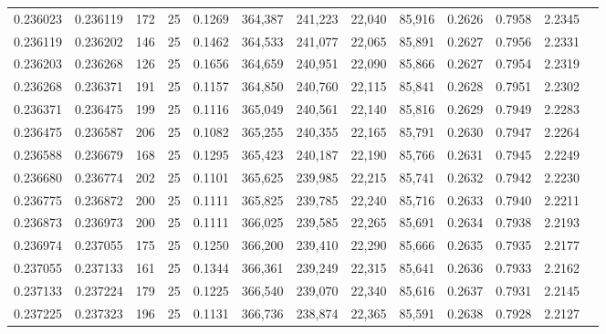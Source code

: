\begin{tabular}{rrrrrrrrrrrrr}
0.236023 & 0.236119 &   172 &  25 &                                     0.1269 & 364,387 & 241,223 &  22,040 &  85,916 & 0.2626 & 0.7958 & 2.2345 \\
0.236119 & 0.236202 &   146 &  25 &                                     0.1462 & 364,533 & 241,077 &  22,065 &  85,891 & 0.2627 & 0.7956 & 2.2331 \\
0.236203 & 0.236268 &   126 &  25 &                                     0.1656 & 364,659 & 240,951 &  22,090 &  85,866 & 0.2627 & 0.7954 & 2.2319 \\
0.236268 & 0.236371 &   191 &  25 &                                     0.1157 & 364,850 & 240,760 &  22,115 &  85,841 & 0.2628 & 0.7951 & 2.2302 \\
0.236371 & 0.236475 &   199 &  25 &                                     0.1116 & 365,049 & 240,561 &  22,140 &  85,816 & 0.2629 & 0.7949 & 2.2283 \\
0.236475 & 0.236587 &   206 &  25 &                                     0.1082 & 365,255 & 240,355 &  22,165 &  85,791 & 0.2630 & 0.7947 & 2.2264 \\
0.236588 & 0.236679 &   168 &  25 &                                     0.1295 & 365,423 & 240,187 &  22,190 &  85,766 & 0.2631 & 0.7945 & 2.2249 \\
0.236680 & 0.236774 &   202 &  25 &                                     0.1101 & 365,625 & 239,985 &  22,215 &  85,741 & 0.2632 & 0.7942 & 2.2230 \\
0.236775 & 0.236872 &   200 &  25 &                                     0.1111 & 365,825 & 239,785 &  22,240 &  85,716 & 0.2633 & 0.7940 & 2.2211 \\
0.236873 & 0.236973 &   200 &  25 &                                     0.1111 & 366,025 & 239,585 &  22,265 &  85,691 & 0.2634 & 0.7938 & 2.2193 \\
0.236974 & 0.237055 &   175 &  25 &                                     0.1250 & 366,200 & 239,410 &  22,290 &  85,666 & 0.2635 & 0.7935 & 2.2177 \\
0.237055 & 0.237133 &   161 &  25 &                                     0.1344 & 366,361 & 239,249 &  22,315 &  85,641 & 0.2636 & 0.7933 & 2.2162 \\
0.237133 & 0.237224 &   179 &  25 &                                     0.1225 & 366,540 & 239,070 &  22,340 &  85,616 & 0.2637 & 0.7931 & 2.2145 \\
0.237225 & 0.237323 &   196 &  25 &                                     0.1131 & 366,736 & 238,874 &  22,365 &  85,591 & 0.2638 & 0.7928 & 2.2127 \\

\end{tabular}
